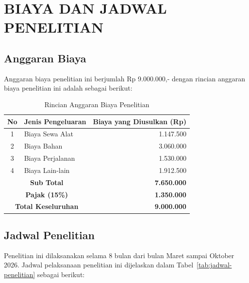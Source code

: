 \chapter{BIAYA DAN JADWAL PENELITIAN}

\section{Anggaran Biaya}

Anggaran biaya penelitian ini berjumlah Rp 9.000.000,- dengan rincian anggaran biaya penelitian ini adalah sebagai berikut:

\begin{table}[htbp]
\centering
\caption{Rincian Anggaran Biaya Penelitian}
\label{tab:anggaran-biaya}
\begin{tabular}{|c|l|r|}
\hline
\textbf{No} & \textbf{Jenis Pengeluaran} & \textbf{Biaya yang Diusulkan (Rp)} \\
\hline
1 & Biaya Sewa Alat & 1.147.500 \\
\hline
2 & Biaya Bahan & 3.060.000 \\
\hline
3 & Biaya Perjalanan & 1.530.000 \\
\hline
4 & Biaya Lain-lain & 1.912.500 \\
\hline
\multicolumn{2}{|c|}{\textbf{Sub Total}} & \textbf{7.650.000} \\
\hline
\multicolumn{2}{|c|}{\textbf{Pajak (15\%)}} & \textbf{1.350.000} \\
\hline
\multicolumn{2}{|c|}{\textbf{Total Keseluruhan}} & \textbf{9.000.000} \\
\hline
\end{tabular}
\end{table}

\section{Jadwal Penelitian}

Penelitian ini dilaksanakan selama 8 bulan dari bulan Maret sampai Oktober 2026. Jadwal pelaksanaan penelitian ini dijelaskan dalam Tabel~\ref{tab:jadwal-penelitian} sebagai berikut:

